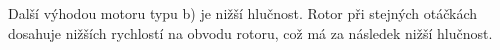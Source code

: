 Další výhodou motoru typu b) je nižší hlučnost. Rotor při stejných otáčkách dosahuje nižších rychlostí na obvodu rotoru,
 což má za následek nižší hlučnost.
 


 

 

